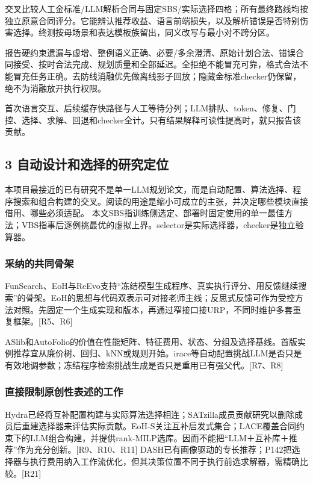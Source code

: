 \documentclass[11pt,a4paper]{article}
\newcommand{\bodytext}[1]{#1\par}
\begin{document}
\bodytext{交叉比较人工金标准/\allowbreak{}LLM解析合同与固定SBS/\allowbreak{}实际选择四格；所有最终路线均按独立原意合同评分。它能辨认推荐收益、语言前端损失，以及解析错误是否特别伤害选择。终测按母场景和表达模板族留出，同义改写与最小对不跨分区。}
\bodytext{报告硬约束遗漏与虚增、整例语义正确、必要/\allowbreak{}多余澄清、原始计划合法、错误合同接受、按时合法完成、规划质量和全部延迟。全拒绝不能冒充可靠，格式合法不能冒充任务正确。去防线消融优先做离线影子回放；隐藏金标准checker仍保留，绝不为消融放开执行权限。}
\bodytext{首次语言交互、后续缓存快路径与人工等待分列；LLM排队、token、修复、门控、选择、求解、回退和checker全计。只有结果解释可读性提高时，就只报告该贡献。}
\subsection{3  自动设计和选择的研究定位}
\bodytext{本项目最接近的已有研究不是单一LLM规划论文，而是自动配置、算法选择、程序搜索和组合构建的交叉。阅读的用途是缩小可成立的主张，并决定哪些模块直接借用、哪些必须适配。 本文SBS指训练侧选定、部署时固定使用的单一最佳方法；VBS指事后逐例挑最优的虚拟上界。selector是实际选择器，checker是独立验算器。}
\subsubsection{采纳的共同骨架}
\bodytext{FunSearch、EoH与ReEvo支持“冻结模型生成程序、真实执行评分、用反馈继续搜索”的骨架。EoH的思想与代码双表示可对接老师主线；反思式反馈可作为受控方法对照。先固定一个生成实现和版本，再通过窄接口接URP，不同时维护多套重复框架。[R5、R6]}
\bodytext{ASlib和AutoFolio的价值在性能矩阵、特征费用、状态、分组及选择基线。首版实例推荐宜从廉价树、回归、kNN或规则开始。irace等自动配置挑战LLM是否只是有效地调参数；冻结程序检索挑战生成是否只是重用已有强父代。[R7、R8]}
\subsubsection{直接限制原创性表述的工作}
\bodytext{Hydra已经将互补配置构建与实际算法选择相连；SATzilla成员贡献研究以删除成员后重建选择器来评估实际贡献。EoH-S关注互补启发式集合；LACE覆盖合同约束下的LLM组合构建，并提供rank-MILP选库。因而不能把“LLM＋互补库＋推荐”作为充分创新。[R9、R10、R11] DASH已有画像驱动的专长推荐；P142把选择器与执行费用纳入工作流优化，但其决策位置不同于执行前选求解器，需精确比较。[R21]}
\end{document}
